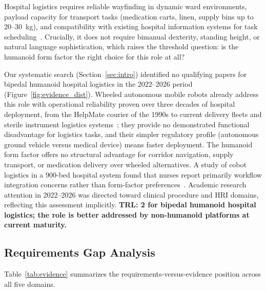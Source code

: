 Hospital logistics requires reliable wayfinding in dynamic ward environments,
payload capacity for transport tasks (medication carts, linen, supply bins up to
20--30~kg), and compatibility with existing hospital information systems for task
scheduling~\cite{ozkil2009service,bloss2011mobile}. Crucially, it does not require bimanual dexterity, standing height,
or natural language sophistication, which raises the threshold question: is the
humanoid form factor the right choice for this role at all?

Our systematic search (Section~\ref{sec:intro}) identified no qualifying papers
for bipedal humanoid hospital logistics in the 2022--2026 period
(Figure~\ref{fig:evidence_dist}). Wheeled autonomous mobile robots already
address this role with operational reliability proven over three decades of
hospital deployment, from the HelpMate courier of the 1990s to current
delivery fleets and sterile instrument logistics
systems~\cite{evans1994helpmate,bloss2011mobile,fragapane2021autonomous}; they
provide no demonstrated functional disadvantage for logistics tasks, and their
simpler regulatory profile (autonomous ground vehicle versus medical device)
means faster deployment.
The humanoid form factor offers no structural advantage for corridor navigation,
supply transport, or medication delivery over wheeled alternatives. A study of cobot logistics in a 900-bed hospital system found that nurses
report primarily workflow integration concerns rather than form-factor
preferences~\cite{birkhoff2024integrating}. Academic research attention in
2022--2026 was directed toward clinical procedure and HRI domains, reflecting this assessment implicitly. \textbf{TRL: 2 for bipedal
humanoid hospital logistics; the role is better addressed by non-humanoid
platforms at current maturity.}

\subsection{Requirements Gap Analysis}
\label{sec:crossdomain}

Table~\ref{tab:evidence} summarizes the requirements-versus-evidence position
across all five domains.

